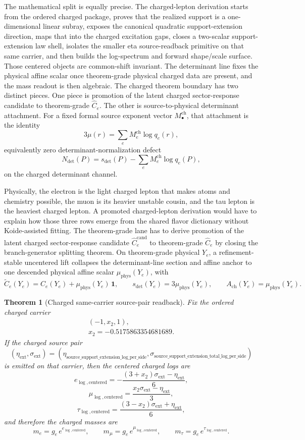\documentclass[11pt]{article}
\newtheorem{theorem}{Theorem}[section]
\begin{document}
The mathematical split is equally precise. The charged-lepton derivation starts from
the ordered charged package, proves that the realized support is a one-dimensional linear subray,
exposes the canonical quadratic support-extension direction, maps that into the charged
excitation gaps, closes a two-scalar support-extension law shell, isolates the smaller eta
source-readback primitive on that same carrier, and then builds the log-spectrum and forward
shape/scale surface. Those centered objects are common-shift invariant. The determinant line fixes the physical affine scalar once theorem-grade physical charged data are present, and the mass readout is then algebraic. The charged theorem boundary has two distinct pieces. One piece is promotion of the latent charged sector-response candidate to theorem-grade \(\widehat C_e\). The other is source-to-physical determinant attachment. For a fixed formal source exponent vector \(M_\bullet^{\mathrm{ch}}\), that attachment is the identity
\[
3\mu(r)=\sum_e M_e^{\mathrm{ch}}\log q_e(r),
\]
equivalently zero determinant-normalization defect
\[
N_{\det}(P)=s_{\det}(P)-\sum_e M_e^{\mathrm{ch}}\log q_e(P),
\]
on the charged determinant channel.

Physically, the electron is the light charged lepton that makes atoms and chemistry possible, the
muon is its heavier unstable cousin, and the tau lepton is the heaviest charged lepton. A promoted
charged-lepton derivation would have to explain how those three rows emerge from the shared flavor
dictionary without Koide-assisted fitting. The theorem-grade lane has to derive promotion of the
latent charged sector-response candidate \(\widehat C_e^{\mathrm{cand}}\) to theorem-grade
\(\widehat C_e\) by closing the branch-generator splitting theorem. On theorem-grade physical
\(Y_e\), a refinement-stable uncentered lift collapses the determinant-line section and affine
anchor to one descended physical affine scalar \(\mu_{\mathrm{phys}}(Y_e)\), with
\[
\widetilde C_e(Y_e)=\widehat C_e(Y_e)+\mu_{\mathrm{phys}}(Y_e)\,\mathbf 1,
\qquad
s_{\det}(Y_e)=3\mu_{\mathrm{phys}}(Y_e),
\qquad
A_{\mathrm{ch}}(Y_e)=\mu_{\mathrm{phys}}(Y_e).
\]

\begin{theorem}[Charged same-carrier source-pair readback]
Fix the ordered charged carrier
\[
\begin{gathered}
(-1,x_2,1),\\
x_2=-0.5175863354681689.
\end{gathered}
\]
If the charged source pair
\[
(\eta_{\mathrm{ext}},\sigma_{\mathrm{ext}})
=
(\eta_{\mathrm{source\_support\_extension\_log\_per\_side}},
\sigma_{\mathrm{source\_support\_extension\_total\_log\_per\_side}})
\]
is emitted on that carrier, then the centered charged logs are
\[
e_{\log,\mathrm{centered}}
=
-\frac{(3+x_2)\sigma_{\mathrm{ext}}-\eta_{\mathrm{ext}}}{6},
\]
\[
\mu_{\log,\mathrm{centered}}
=
\frac{x_2\sigma_{\mathrm{ext}}-\eta_{\mathrm{ext}}}{3},
\]
\[
\tau_{\log,\mathrm{centered}}
=
\frac{(3-x_2)\sigma_{\mathrm{ext}}+\eta_{\mathrm{ext}}}{6},
\]
and therefore the charged masses are
\[
m_e = g_e\,e^{e_{\log,\mathrm{centered}}},
\qquad
m_\mu = g_e\,e^{\mu_{\log,\mathrm{centered}}},
\qquad
m_\tau = g_e\,e^{\tau_{\log,\mathrm{centered}}}.
\]
\end{theorem}
\end{document}
